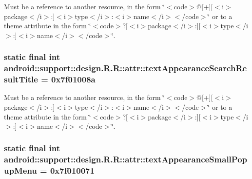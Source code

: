Must be a reference to another resource, in the form \char`\"{}$<$code$>$@\mbox{[}+\mbox{]}\mbox{[}$<$i$>$package$<$/i$>$:\mbox{]}$<$i$>$type$<$/i$>$:$<$i$>$name$<$/i$>$$<$/code$>$\char`\"{} or to a theme attribute in the form \char`\"{}$<$code$>$?\mbox{[}$<$i$>$package$<$/i$>$:\mbox{]}\mbox{[}$<$i$>$type$<$/i$>$:\mbox{]}$<$i$>$name$<$/i$>$$<$/code$>$\char`\"{}. \hypertarget{classandroid_1_1support_1_1design_1_1_r_1_1attr_23d9daef94ec3e8cdd8fcd67e7fc3b74}{
\subsubsection[{textAppearanceSearchResultTitle}]{\setlength{\rightskip}{0pt plus 5cm}static final int android::support::design.R.R::attr::textAppearanceSearchResultTitle = 0x7f01008a}}
\label{classandroid_1_1support_1_1design_1_1_r_1_1attr_23d9daef94ec3e8cdd8fcd67e7fc3b74}


Must be a reference to another resource, in the form \char`\"{}$<$code$>$@\mbox{[}+\mbox{]}\mbox{[}$<$i$>$package$<$/i$>$:\mbox{]}$<$i$>$type$<$/i$>$:$<$i$>$name$<$/i$>$$<$/code$>$\char`\"{} or to a theme attribute in the form \char`\"{}$<$code$>$?\mbox{[}$<$i$>$package$<$/i$>$:\mbox{]}\mbox{[}$<$i$>$type$<$/i$>$:\mbox{]}$<$i$>$name$<$/i$>$$<$/code$>$\char`\"{}. \hypertarget{classandroid_1_1support_1_1design_1_1_r_1_1attr_68a009469af4147874fa00c6e8d7563c}{
\subsubsection[{textAppearanceSmallPopupMenu}]{\setlength{\rightskip}{0pt plus 5cm}static final int android::support::design.R.R::attr::textAppearanceSmallPopupMenu = 0x7f010071}}
\label{classandroid_1_1support_1_1design_1_1_r_1_1attr_68a009469af4147874fa00c6e8d7563c}


